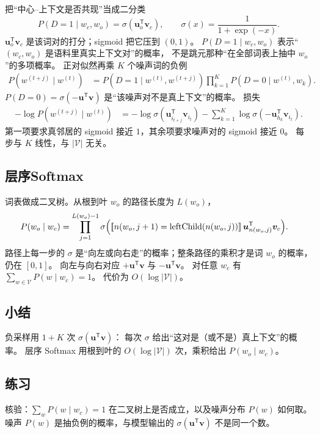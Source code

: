 把“中心–上下文是否共现”当成二分类
\[
P(D=1\mid w_c,w_o)=\sigma(\bm{u}_o^{\mathsf T}\bm{v}_c),\qquad
\sigma(x)=\frac1{1+\exp(-x)}.
\]
$\bm{u}_o^{\mathsf T}\bm{v}_c$ 是该词对的打分；sigmoid 把它压到 $(0,1)$。
$P(D=1\mid w_c,w_o)$ 表示“$(w_c,w_o)$ 是语料里真实上下文对”的概率，
不是跳元那种“在全部词表上抽中 $w_o$”的多项概率。
正对似然再乘 $K$ 个噪声词的负例
\begin{align*}
P(w^{(t+j)}\mid w^{(t)})
&=
P(D=1\mid w^{(t)},w^{(t+j)})
\prod_{k=1}^{K}
P(D=0\mid w^{(t)},w_k).
\end{align*}
$P(D=0)=\sigma(-\bm{u}^{\mathsf T}\bm{v})$ 是“该噪声对不是真上下文”的概率。
损失
\begin{align*}
-\log P(w^{(t+j)}\mid w^{(t)})
&=
-\log\sigma(\bm{u}_{i_{t+j}}^{\mathsf T}\bm{v}_{i_t})
-\sum_{k=1}^{K}
\log\sigma(-\bm{u}_{h_k}^{\mathsf T}\bm{v}_{i_t}).
\end{align*}
第一项要求真邻居的 sigmoid 接近 $1$，其余项要求噪声对的 sigmoid 接近 $0$。
每步与 $K$ 线性，与 $|\mathcal{V}|$ 无关。

\subsection{层序Softmax}

词表做成二叉树。从根到叶 $w_o$ 的路径长度为 $L(w_o)$，
\begin{align*}
P(w_o\mid w_c)
&=
\prod_{j=1}^{L(w_o)-1}
\sigma\Bigl(
[\![n(w_o,j+1)=\mathrm{leftChild}(n(w_o,j))]\!]
\,\bm{u}_{n(w_o,j)}^{\mathsf T}\bm{v}_c
\Bigr).
\end{align*}
路径上每一步的 $\sigma$ 是“向左或向右走”的概率；整条路径的乘积才是词 $w_o$ 的概率，仍在 $[0,1]$。
向左与向右对应 $+\bm{u}^{\mathsf T}\bm{v}$ 与 $-\bm{u}^{\mathsf T}\bm{v}$。
对任意 $w_c$ 有 $\sum_{w\in\mathcal{V}}P(w\mid w_c)=1$。
代价为 $O(\log|\mathcal{V}|)$。

\subsection{小结}

负采样用 $1+K$ 次 $\sigma(\bm{u}^{\mathsf T}\bm{v})$：
每次 $\sigma$ 给出“这对是（或不是）真上下文”的概率。
层序 Softmax 用根到叶的 $O(\log|\mathcal{V}|)$ 次，乘积给出 $P(w_o\mid w_c)$。

\subsection{练习}

核验：$\sum_w P(w\mid w_c)=1$ 在二叉树上是否成立，以及噪声分布 $P(w)$ 如何取。
噪声 $P(w)$ 是抽负例的概率，与模型输出的 $\sigma(\bm{u}^{\mathsf T}\bm{v})$ 不是同一个数。


